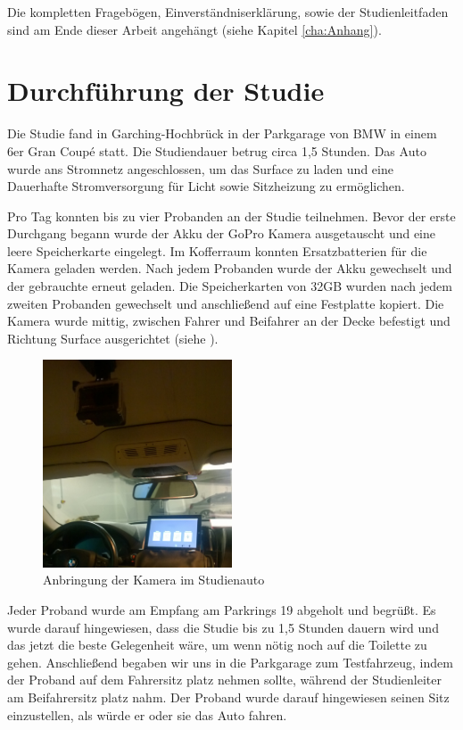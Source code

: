 Die kompletten Fragebögen, Einverständniserklärung, sowie der Studienleitfaden sind am Ende dieser Arbeit angehängt (siehe Kapitel \ref{cha:Anhang}).

\section{Durchführung der Studie}
Die Studie fand in Garching-Hochbrück in der Parkgarage von BMW in einem 6er Gran Coupé statt. 
Die Studiendauer betrug circa 1,5 Stunden. 
Das Auto wurde ans Stromnetz angeschlossen, um das Surface zu laden und eine Dauerhafte Stromversorgung für Licht sowie Sitzheizung zu ermöglichen.

Pro Tag konnten bis zu vier Probanden an der Studie teilnehmen. 
Bevor der erste Durchgang begann wurde der Akku der GoPro Kamera ausgetauscht und eine leere Speicherkarte eingelegt. 
Im Kofferraum konnten Ersatzbatterien für die Kamera geladen werden. 
Nach jedem Probanden wurde der Akku gewechselt und der gebrauchte erneut geladen. 
Die Speicherkarten von 32GB wurden nach jedem zweiten Probanden gewechselt und anschließend auf eine Festplatte kopiert. 
Die Kamera wurde mittig, zwischen Fahrer und Beifahrer an der Decke befestigt und Richtung Surface ausgerichtet (siehe ).
\begin{figure}[ht]
  \centering
  \includegraphics[width=0.5\textwidth]{img/Kamera3.jpg}
  \caption{Anbringung der Kamera im Studienauto}
  \label{fig:Kamera}
\end{figure} 

Jeder Proband wurde am Empfang am Parkrings 19 abgeholt und begrüßt.
Es wurde darauf hingewiesen, dass die Studie bis zu 1,5 Stunden dauern wird und das jetzt die beste Gelegenheit wäre, um wenn nötig noch auf die Toilette zu gehen.
Anschließend begaben wir uns in die Parkgarage zum Testfahrzeug, indem der Proband auf dem Fahrersitz platz nehmen sollte, während der Studienleiter am Beifahrersitz platz nahm.
Der Proband wurde darauf hingewiesen seinen Sitz einzustellen, als würde er oder sie das Auto fahren.

